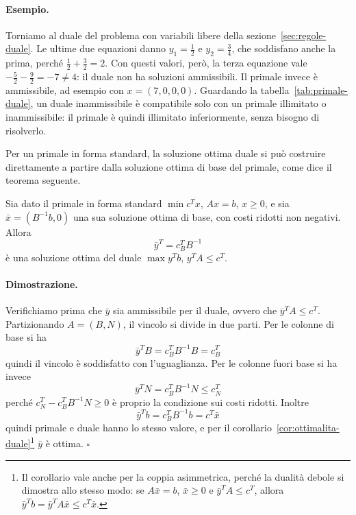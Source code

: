 \paragraph{Esempio.}
Torniamo al duale del problema con variabili libere della sezione~\ref{sec:regole-duale}. Le ultime due equazioni danno $y_1 = \frac12$ e $y_2 = \frac34$, che soddisfano anche la prima, perché $\frac12 + \frac32 = 2$. Con questi valori, però, la terza equazione vale $-\frac52 - \frac92 = -7 \neq 4$: il duale non ha soluzioni ammissibili. Il primale invece è ammissibile, ad esempio con $x = (7, 0, 0, 0)$. Guardando la tabella~\ref{tab:primale-duale}, un duale inammissibile è compatibile solo con un primale illimitato o inammissibile: il primale è quindi illimitato inferiormente, senza bisogno di risolverlo.

Per un primale in forma standard, la soluzione ottima duale si può costruire direttamente a partire dalla soluzione ottima di base del primale, come dice il teorema seguente.

\begin{teorema}\label{teo:sol-duale}
Sia dato il primale in forma standard $\min c^T x$, $Ax = b$, $x \ge 0$, e sia $\bar{x} = (B^{-1}b, 0)$ una sua soluzione ottima di base, con costi ridotti non negativi. Allora
\[
\bar{y}^T = c_B^T B^{-1}
\]
è una soluzione ottima del duale $\max y^T b$, $y^T A \le c^T$.
\end{teorema}

\paragraph{Dimostrazione.}
Verifichiamo prima che $\bar{y}$ sia ammissibile per il duale, ovvero che $\bar{y}^T A \le c^T$. Partizionando $A = (B, N)$, il vincolo si divide in due parti. Per le colonne di base si ha
\[
\bar{y}^T B = c_B^T B^{-1} B = c_B^T
\]
quindi il vincolo è soddisfatto con l'uguaglianza. Per le colonne fuori base si ha invece
\[
\bar{y}^T N = c_B^T B^{-1} N \le c_N^T
\]
perché $c_N^T - c_B^T B^{-1} N \ge 0$ è proprio la condizione sui costi ridotti. Inoltre
\[
\bar{y}^T b = c_B^T B^{-1} b = c^T \bar{x}
\]
quindi primale e duale hanno lo stesso valore, e per il corollario~\ref{cor:ottimalita-duale}\footnote{Il corollario vale anche per la coppia asimmetrica, perché la dualità debole si dimostra allo stesso modo: se $A\bar{x} = b$, $\bar{x} \ge 0$ e $\bar{y}^T A \le c^T$, allora $\bar{y}^T b = \bar{y}^T A \bar{x} \le c^T \bar{x}$.} $\bar{y}$ è ottima. \hfill $\square$

